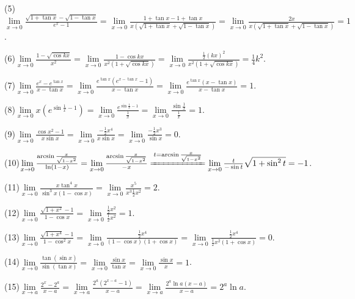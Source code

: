 \documentclass[12pt,UTF8]{ctexart}
\begin{document}
\begin{enumerate}
(5)$\lim\limits_{x\rightarrow0}\frac{\sqrt{1+\tan x}-\sqrt{1-\tan x}}{e^x-1}=\lim\limits_{x\rightarrow0}\frac{1+\tan x-1+\tan x}{x(\sqrt{1+\tan x}+\sqrt{1-\tan x})}=\lim\limits_{x\rightarrow0}\frac{2x}{x(\sqrt{1+\tan x}+\sqrt{1-\tan x})}=1$.

(6)$\lim\limits_{x\rightarrow0}\frac{1-\sqrt{\cos kx}}{x^2}=\lim\limits_{x\rightarrow0}\frac{1-\cos kx}{x^2(1+\sqrt{\cos kx})}=\lim\limits_{x\rightarrow0}\frac{\frac12(kx)^2}{x^2(1+\sqrt{\cos kx})}=\frac14k^2$.

(7)$\lim\limits_{x\rightarrow0}\frac{e^x-e^{\tan x}}{x-\tan x}=\lim\limits_{x\rightarrow0}\frac{e^{\tan x}(e^{x-\tan x}-1)}{x-\tan x}=\lim\limits_{x\rightarrow0}\frac{e^{\tan x}(x-\tan x)}{x-\tan x}=1$.

(8)$\lim\limits_{x\rightarrow0}x(e^{\sin\frac1x-1})=\lim\limits_{x\rightarrow0}\frac{e^{\sin\frac1x-1}}{\frac1x}=\lim\limits_{x\rightarrow0}\frac{\sin\frac1x}{\frac1x}=1$.

(9)$\lim\limits_{x\rightarrow0}\frac{\cos x^2-1}{x\sin x}=\lim\limits_{x\rightarrow0}\frac{-\frac12x^4}{x\sin x}=\lim\limits_{x\rightarrow0}\frac{-\frac12x^3}{\sin x}=0$.

(10)$\lim\limits_{x\rightarrow0}\frac{\arcsin\frac{x}{\sqrt{1-x^2}}}{\ln(1-x)}=\lim\limits_{x\rightarrow0}\frac{\arcsin\frac{x}{\sqrt{1-x^2}}}{-x}\xlongequal{t=\arcsin\frac{x}{\sqrt{1-x^2}}}\lim\limits_{x\rightarrow0}\frac{t}{-\sin t}\sqrt{1+\sin^2t}=-1$.

(11)$\lim\limits_{x\rightarrow0}\frac{x\tan^4x}{\sin^3x(1-\cos x)}=\lim\limits_{x\rightarrow0}\frac{x^5}{x^3\frac12x^2}=2$.

(12)$\lim\limits_{x\rightarrow0}\frac{\sqrt{1+x^2}-1}{1-\cos x}=\lim\limits_{x\rightarrow0}\frac{\frac12x^2}{\frac12x^2}=1$.

(13)$\lim\limits_{x\rightarrow0}\frac{\sqrt{1+x^4}-1}{1-\cos^2x}=\lim\limits_{x\rightarrow0}\frac{\frac12x^4}{(1-\cos x)(1+\cos x)}=\lim\limits_{x\rightarrow0}\frac{\frac12x^4}{\frac12x^2(1+\cos x)}=0$.

(14)$\lim\limits_{x\rightarrow0}\frac{\tan(\sin x)}{\sin(\tan x)}=\lim\limits_{x\rightarrow0}\frac{\sin x}{\tan x}=\lim\limits_{x\rightarrow0}\frac{\sin x}{x}=1$.

(15)$\lim\limits_{x\rightarrow a}\frac{2^x-2^a}{x-a}=\lim\limits_{x\rightarrow a}\frac{2^a(2^{x-a}-1)}{x-a}=\lim\limits_{x\rightarrow a}\frac{2^a\ln a(x-a)}{x-a}=2^a\ln a$.
\end{enumerate}
\end{document}
